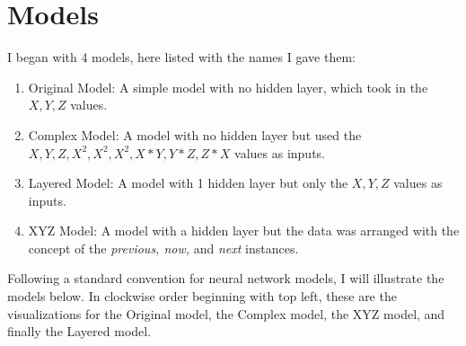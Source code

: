 \documentclass[]{report}
\begin{document}
\section{Models}

I began with 4 models, here listed with the names I gave them:
\begin{enumerate}
	\item Original Model: A simple model with no hidden layer, which took in the $X,Y,Z$ values.
	\item Complex Model: A model with no hidden layer but used the $X,Y,Z,X^{2},X^{2},X^{2},X*Y,Y*Z,Z*X$ values as inputs.
	\item Layered Model: A model with 1 hidden layer but only the $X,Y,Z$ values as inputs.
	\item XYZ Model: A model with a hidden layer but the data was arranged with the concept of the \textit{previous, now,} and \textit{next} instances.\\
\end{enumerate}

Following a standard convention for neural network models, I will illustrate the models below.
In clockwise order beginning with top left, these are the visualizations for the Original model, the Complex model, the XYZ model, and finally the Layered model.
\end{document}
